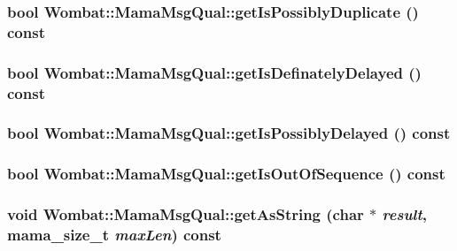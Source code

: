 \label{classWombat_1_1MamaMsgQual_a4fadea109baf034c7639e0b31814835d}
\hypertarget{classWombat_1_1MamaMsgQual_a59ef851d6aef9eecec061704c55ceae6}{
\subsubsection[{getIsPossiblyDuplicate}]{\setlength{\rightskip}{0pt plus 5cm}bool Wombat::MamaMsgQual::getIsPossiblyDuplicate () const}}
\label{classWombat_1_1MamaMsgQual_a59ef851d6aef9eecec061704c55ceae6}
\hypertarget{classWombat_1_1MamaMsgQual_ae363d627b79c29e47ed9baa35eba849a}{
\subsubsection[{getIsDefinatelyDelayed}]{\setlength{\rightskip}{0pt plus 5cm}bool Wombat::MamaMsgQual::getIsDefinatelyDelayed () const}}
\label{classWombat_1_1MamaMsgQual_ae363d627b79c29e47ed9baa35eba849a}
\hypertarget{classWombat_1_1MamaMsgQual_a8f4ea7ad64fe11870c715660b10f35ee}{
\subsubsection[{getIsPossiblyDelayed}]{\setlength{\rightskip}{0pt plus 5cm}bool Wombat::MamaMsgQual::getIsPossiblyDelayed () const}}
\label{classWombat_1_1MamaMsgQual_a8f4ea7ad64fe11870c715660b10f35ee}
\hypertarget{classWombat_1_1MamaMsgQual_a84a18ecfd8d1c046233f65379a1f6259}{
\subsubsection[{getIsOutOfSequence}]{\setlength{\rightskip}{0pt plus 5cm}bool Wombat::MamaMsgQual::getIsOutOfSequence () const}}
\label{classWombat_1_1MamaMsgQual_a84a18ecfd8d1c046233f65379a1f6259}
\hypertarget{classWombat_1_1MamaMsgQual_ac69c4a732a33ace286a6ac338b5ebab6}{
\subsubsection[{getAsString}]{\setlength{\rightskip}{0pt plus 5cm}void Wombat::MamaMsgQual::getAsString (char $\ast$ {\em result}, \/  {\bf mama\_\-size\_\-t} {\em maxLen}) const}}
